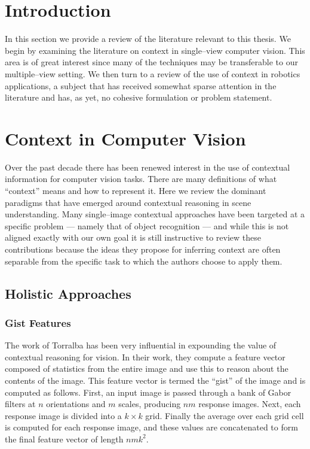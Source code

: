 \section{Introduction}
In this section we provide a review of the literature relevant to this
thesis. We begin by examining the literature on context in
single--view computer vision. This area is of great interest since
many of the techniques may be transferable to our multiple--view
setting. We then turn to a review of the use of context in robotics
applications, a subject that has received somewhat sparse attention in
the literature and has, as yet, no cohesive formulation or problem
statement. 


\section{Context in Computer Vision}
Over the past decade there has been renewed interest in the use of
contextual information for computer vision tasks. There are many
definitions of what ``context'' means and how to represent it. Here we
review the dominant paradigms that have emerged around contextual
reasoning in scene understanding. Many single--image contextual
approaches have been targeted at a specific problem --- namely that of
object recognition --- and while this is not aligned exactly with our
own goal it is still instructive to review these contributions because
the ideas they propose for inferring context are often separable from
the specific task to which the authors choose to apply them.

\subsection{Holistic Approaches}

\subsubsection{Gist Features}
The work of Torralba \etal \cite{Torralba03} has been very influential
in expounding the value of contextual reasoning for vision. In their
work, they compute a feature vector composed of statistics from the
entire image and use this to reason about the contents of the
image. This feature vector is termed the ``gist'' of the image and is
computed as follows. First, an input image is passed through a bank of
Gabor filters at $n$ orientations and $m$ scales, producing $nm$
response images. Next, each response image is divided into a $k \times
k$ grid. Finally the average over each grid cell is computed for each
response image, and these values are concatenated to form the final
feature vector of length $nmk^2$.

